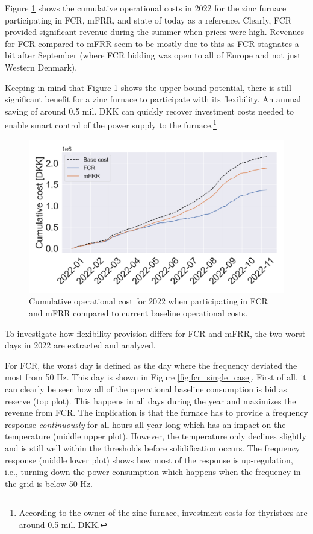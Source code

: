\documentclass[lettersize,journal]{IEEEtran}
\begin{document}
Figure \ref{fig:cumulative_cost_comparison} shows the cumulative operational costs in 2022 for the zinc furnace participating in FCR, mFRR, and state of today as a reference. Clearly, FCR provided significant revenue during the summer when prices were high. Revenues for FCR compared to mFRR seem to be mostly due to this as FCR stagnates a bit after September (where FCR bidding was open to all of Europe and not just Western Denmark).

Keeping in mind that Figure \ref{fig:cumulative_cost_comparison} shows the upper bound potential, there is still significant benefit for a zinc furnace to participate with its flexibility. An annual saving of around 0.5 mil. DKK can quickly recover investment costs needed to enable smart control of the power supply to the furnace.\footnote{According to the owner of the zinc furnace, investment costs for thyristors are around 0.5 mil. DKK.}


\begin{figure}[!t]
    \centering
    \includegraphics[width=\columnwidth]{figures/cumulative_cost_comparison.png}
    \caption{Cumulative operational cost for 2022 when participating in FCR and mFRR compared to current baseline operational costs.}
    \label{fig:cumulative_cost_comparison}
\end{figure}

To investigate how flexibility provision differs for FCR and mFRR, the two worst days in 2022 are extracted and analyzed.

For FCR, the worst day is defined as the day where the frequency deviated the most from 50 Hz. This day is shown in Figure \ref{fig:fcr_single_case}. First of all, it can clearly be seen how all of the operational baseline consumption is bid as reserve (top plot). This happens in all days during the year and maximizes the revenue from FCR. The implication is that the furnace has to provide a frequency response \textit{continuously} for all hours all year long which has an impact on the temperature (middle upper plot). However, the temperature only declines slightly and is still well within the thresholds before solidification occurs. The frequency response (middle lower plot) shows how most of the response is up-regulation, i.e., turning down the power consumption which happens when the frequency in the grid is below 50 Hz.
\end{document}
